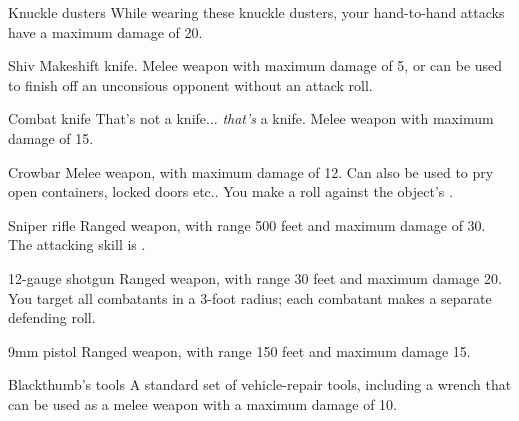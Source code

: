 
\begin{describe}{Knuckle dusters}
  While wearing these knuckle dusters, your hand-to-hand attacks have a maximum damage of 20.
\end{describe}

\begin{describe}{Shiv}
  Makeshift knife. Melee weapon with maximum damage of 5, or can be used to finish off an unconsious opponent without an attack roll.
\end{describe}

\begin{describe}{Combat knife}
  That's not a knife... \emph{that's} a knife. Melee weapon with maximum damage of 15.
\end{describe}

\begin{describe}{Crowbar}
  Melee weapon, with maximum damage of 12. Can also be used to pry open containers, locked doors etc.. You make a  roll against the object's .
\end{describe}

\begin{describe}{Sniper rifle}
  Ranged weapon, with range 500 feet and maximum damage of 30. The attacking skill is .
\end{describe}

\begin{describe}{12-gauge shotgun}
  Ranged weapon, with range 30 feet and maximum damage 20. You target all combatants in a 3-foot radius; each combatant makes a separate defending roll.
\end{describe}

\begin{describe}{9mm pistol}
  Ranged weapon, with range 150 feet and maximum damage 15.
\end{describe}

\begin{describe}{Blackthumb's tools}
  A standard set of vehicle-repair tools, including a wrench that can be used as a melee weapon with a maximum damage of 10.
\end{describe}

